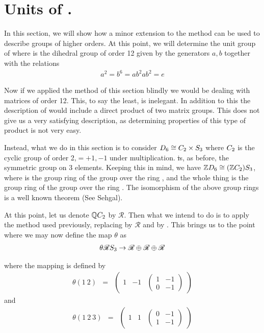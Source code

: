 \documentclass[11pt]{report}
\begin{document}
\section{Units of \intdsx.}
In this section, we will show how a minor extension to the method 
can be used to
describe groups of higher orders. At this point, we will 
determine the unit group of \intdsx
where \dsx is the dihedral group of order 12 given by the 
generators $a,b$ together with the
relations
\begin{align*}
a^2=b^6=ab^2ab^2=e
\end{align*}

Now if we applied the method of this section blindly we would be 
dealing with matrices of
order 12. This, to say the least, is inelegant. In addition to 
this the description of \ug{\intdsx}
would include a direct product of two matrix groups. This does 
not give us a very satisfying
description, as determining properties of this type of product is 
not very easy.

Instead, what we do in this section is to consider $D_6 \cong C_2 \times S_3$
where $C_2$ is the cyclic
group of order 2,$={ +1,-1}$ under multiplication. \st is, as 
before, the symmetric group on 3
elements. Keeping this in mind, we have $ \mathbb{Z}D_6 \cong ( \mathbb{Z}C_2)S_3$, where 
\intctwo{} is the group ring of the
group \ctwo{} over the ring \integers, and the whole thing is the group ring 
of the group \st{} over the ring
\intctwo. The isomorphism of the above group rings is a well known 
theorem (See Sehgal\cite{bib:sehgal78}).

At this point, let us denote $ \mathbb{Q} C_2$ by $\mathscr{R}$. Then what we intend to do 
is to apply the
method used previously, replacing \rat{} by  $\mathscr{R}$ and \integers{} by \intctwo. This 
brings us to the point where we may now define the map $\theta$ as
\begin{align*}
\theta \mathscr{R}S_3\rightarrow\mathscr{R}\oplus\mathscr{R}\oplus\mathscr{R}
\end{align*}

where the mapping is defined by
\begin{align*}
\theta(1\ 2)&=& \begin{pmatrix}
1&-1&
\begin{pmatrix}
1&-1\\
0&-1
\end{pmatrix}
\end{pmatrix}
\end{align*}
and
\begin{align*}
\theta(1\ 2\ 3)&=& \begin{pmatrix}
1&1&
\begin{pmatrix}
0&-1\\
1&-1
\end{pmatrix}
\end{pmatrix}
\end{align*}
\end{document}
